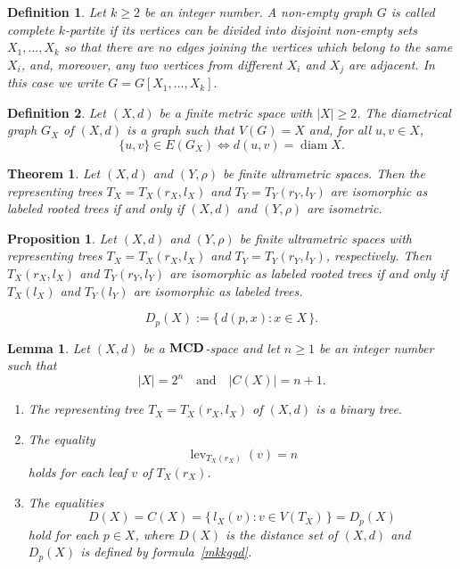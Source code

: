 \documentclass[10pt,a4paper]{amsart}
\newtheorem{defn}{Definition}
\newtheorem{thm}{Theorem}
\newtheorem{prop}{Proposition}
\newtheorem{lem}{Lemma}
\begin{document}
\begin{defn}\label{edrtaa}
Let $k\geq 2$ be an integer number.
A non-empty graph $G$ is called complete $k$-partite if its vertices can be divided into disjoint non-empty sets $X_1,\ldots,X_k$ so that there are no edges joining the vertices which belong to the same $X_i$, and, moreover, any two vertices from different $X_i$ and $X_j$ are adjacent. In this case we write
\(
G=G[X_1,\ldots,X_k].
\)
\end{defn}

\begin{defn}\label{okiu}
Let $(X,d)$ be a finite metric space with $|X|\geq 2$. The diametrical graph $G_X$ of $(X,d)$ is a graph such that $V(G)=X$ and, for all $u,v\in X$,
\[
\{u,v\}\in E(G_{X})
\iff
d(u,v)=\operatorname{diam}X.
\]
\end{defn}

\begin{thm}\label{rvqqbb}
Let $(X,d)$ and $(Y,\rho)$ be  finite ultrametric spaces. Then the representing trees
$T_X=T_X(r_X,
l_X)$ and $T_Y=T_Y(r_Y,l_Y)$ are isomorphic as labeled rooted trees if and only if
$(X,d)$ and $(Y,\rho)$ are isometric.
\end{thm}

\begin{prop}\label{effrt}
Let $(X,d)$ and $(Y,\rho)$ be finite ultrametric spaces with  representing trees $T_X=T_X(r_X,l_X)$ and $T_Y=T_Y(r_Y,l_Y)$, respectively. Then 
\(
T_X(r_X,l_X)
\) and \(
T_Y(r_Y,l_Y)
\)
are isomorphic as labeled rooted trees if and only if
\(
T_X(l_X)
\) and
\(T_Y(l_Y)
\)
are isomorphic as labeled trees.
\end{prop}

\begin{equation}
    \label{mkkggd}
D_p(X) := \{\, d(p,x) : x \in X \,\}.
\end{equation}

\begin{lem} \label{UT2Lemma3}
Let $(X,d)$ be a ${\bf MCD}$-space and let $n \geq 1$ be an integer number such that 
\begin{equation}
    \label{fl}
|X|=2^n
\quad\text{and}\quad
|C(X)|=n+1.
\end{equation}
\begin{enumerate}
\item[(i)]  The representing tree
\(
T_{ X}=T_{ X}(r_{ X},l_{ X})
\)
of $( X,d)$ is a binary tree.

\item[(ii)]  The equality
\begin{equation*}
\operatorname{lev}_{T_X(r_X)}(v)=n
\end{equation*}
holds for each leaf $v$ of $T_{ X}(r_X)$.

\item[(iii)] The equalities
\begin{equation}
    \label{o1}
D(X)=C(X)=\{\,l_X(v):v\in V(T_X)\,\}=D_p(X)
\end{equation}
hold for each \(p\in X\),
where $D( X)$ is the distance set of $( X,d)$ and
$D_p( X)$ is defined by formula~\eqref{mkkggd}.
\end{enumerate}
\end{lem}
\end{document}
